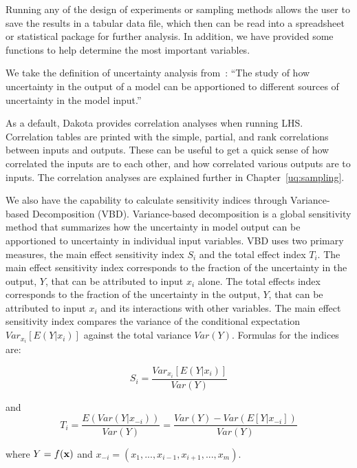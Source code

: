 Running any of the design of experiments or sampling methods allows
the user to save the results in a tabular data file, which then can be
read into a spreadsheet or statistical package for further analysis.
In addition, we have provided some functions to help determine the
most important variables.

We take the definition of uncertainty analysis from~\cite{Sal04}: 
``The study of how uncertainty in the output of a model can be 
apportioned to different sources of uncertainty in the model input.''

As a default, Dakota provides correlation analyses when running LHS.
Correlation tables are printed with the simple, partial, and rank
correlations between inputs and outputs. These can be useful to get a
quick sense of how correlated the inputs are to each other, and how
correlated various outputs are to inputs. The correlation analyses are
explained further in Chapter~\ref{uq:sampling}.

We also have the capability to calculate sensitivity indices through
Variance-based Decomposition (VBD). Variance-based decomposition 
is a global sensitivity method that summarizes how the uncertainty 
in model output can be apportioned to uncertainty in individual 
input variables. VBD uses two primary measures, the main effect 
sensitivity index $S_{i}$ and the total effect index $T_{i}$. The 
main effect sensitivity 
index corresponds to the fraction of the uncertainty in the output, $Y$, 
that can be attributed to input $x_{i}$ alone. The total effects index 
corresponds to the fraction of the uncertainty in 
the output, $Y$, that can be attributed to input $x_{i}$ and its 
interactions with other variables. The main effect sensitivity index
compares the variance of the conditional expectation
$Var_{x_{i}}[E(Y|x_{i})]$ against the total variance $Var(Y)$.
Formulas for the indices are: 

\begin{equation}
S_{i}=\frac{Var_{x_{i}}[E(Y|x_{i})]}{Var(Y)} \label{eq:VBD_Si}
\end{equation}

and 
\begin{equation}
T_{i}=\frac{E(Var(Y|x_{-i}))}{Var(Y)}=\frac{Var(Y)-Var(E[Y|x_{-i}])}{Var(Y)} \label{eq:VBD_Ti}
\end{equation}

where $Y=f({\bf x})$ and ${x_{-i}=(x_{1},...,x_{i-1},x_{i+1},...,x_{m})}$.


